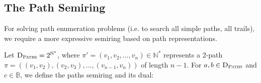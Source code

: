 %
%

\subsection{The Path Semiring}

For solving path enumeration problems (i.e. to search all simple paths, all trails), we require a more expressive semiring based on path representations.

Let $\textsc{D}_{\textsc{Paths}} = 2^{\mathbb{N}^*}$, where $\pi' = (v_1, v_2, \ldots, v_n) \in \mathbb{N}^*$ represents a 2-path $\pi = ((v_1, v_2), (v_2, v_3), \ldots, (v_{n-1}, v_n))$ of length $n-1$. For $a, b \in \textsc{D}_{\textsc{Paths}}$ and $c \in \mathbb{B}$, we define the paths semiring and its dual:

